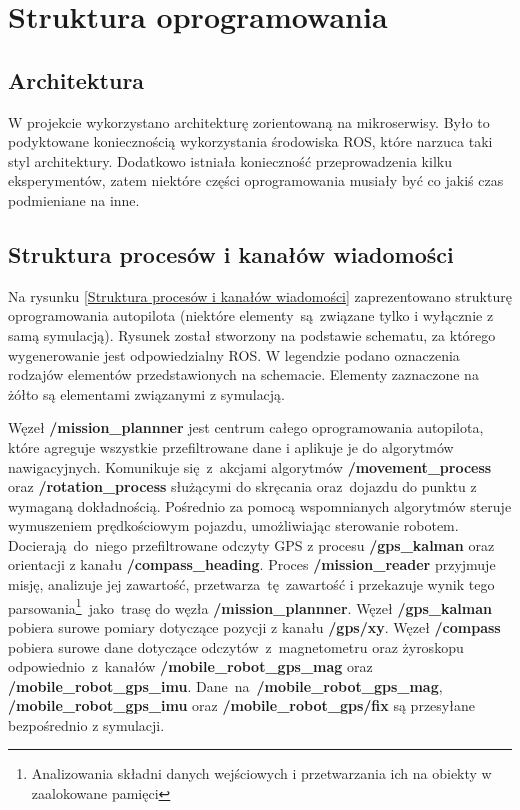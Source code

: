 \newpage
\label{soft_struct}
\section{Struktura oprogramowania}
{
    \subsection{Architektura}
    {
        W projekcie wykorzystano architekturę zorientowaną na mikroserwisy. Było to podyktowane koniecznością wykorzystania środowiska ROS, które narzuca taki styl architektury. Dodatkowo istniała konieczność przeprowadzenia kilku eksperymentów, zatem niektóre części oprogramowania musiały być co jakiś czas podmieniane na inne. 
    }
    \subsection{Struktura procesów i kanałów wiadomości}
    {
        Na rysunku \ref{Struktura procesów i kanałów wiadomości} zaprezentowano strukturę oprogramowania autopilota (niektóre elementy~są~związane tylko i wyłącznie z samą symulacją). Rysunek został stworzony na podstawie schematu, za którego wygenerowanie jest odpowiedzialny ROS. W legendzie podano oznaczenia rodzajów elementów przedstawionych na schemacie. Elementy zaznaczone na żółto są elementami związanymi z symulacją.

        Węzeł \textbf{/mission\_plannner} jest centrum całego oprogramowania autopilota, które agreguje wszystkie przefiltrowane dane i aplikuje je do algorytmów nawigacyjnych. Komunikuje się~z~akcjami algorytmów \textbf{/movement\_process} oraz \textbf{/rotation\_process} służącymi do skręcania oraz~dojazdu do punktu z wymaganą dokładnością. Pośrednio za pomocą wspomnianych algorytmów steruje wymuszeniem prędkościowym pojazdu, umożliwiając sterowanie robotem. Docierają~do~niego przefiltrowane odczyty GPS z procesu \textbf{/gps\_kalman} oraz orientacji z kanału \textbf{/compass\_heading}. 
        Proces \textbf{/mission\_reader} przyjmuje misję, analizuje jej zawartość, przetwarza~tę~zawartość i przekazuje wynik tego parsowania\footnote{Analizowania składni danych wejściowych i przetwarzania ich na obiekty w zaalokowane pamięci}~jako~trasę do węzła \textbf{/mission\_plannner}. Węzeł \textbf{/gps\_kalman} pobiera surowe pomiary dotyczące pozycji z kanału \textbf{/gps/xy}. 
        Węzeł \textbf{/compass} pobiera surowe dane dotyczące odczytów~z~magnetometru oraz żyroskopu odpowiednio~z~kanałów \textbf{/mobile\_robot\_gps\_mag} oraz \textbf{/mobile\_robot\_gps\_imu}. 
        Dane~na~\textbf{/mobile\_robot\_gps\_mag}, \textbf{/mobile\_robot\_gps\_imu} oraz \textbf{/mobile\_robot\_gps/fix} są przesyłane bezpośrednio z symulacji.

}}
